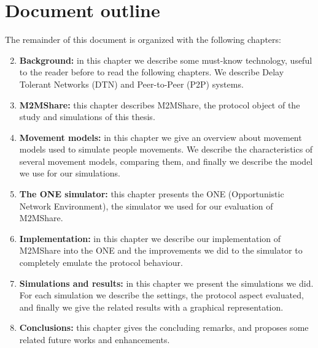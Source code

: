 \section{Document outline}
The remainder of this document is organized with the following chapters:
\begin{enumerate}
\setcounter{enumi}{1}
\item \textbf{Background:} in this chapter we describe some must-know technology, useful to the reader before to read the following chapters. We describe Delay Tolerant Networks (DTN) and Peer-to-Peer (P2P) systems.
\item \textbf{M2MShare:} this chapter describes M2MShare, the protocol object of the study and simulations of this thesis.
\item \textbf{Movement models:} in this chapter we give an overview about movement models used to simulate people movements. We describe the characteristics of several movement models, comparing them, and finally we describe the model we use for our simulations.
\item \textbf{The ONE simulator:} this chapter presents the ONE (Opportunistic Network Environment), the simulator we used for our evaluation of M2MShare.
\item \textbf{Implementation:} in this chapter we describe our implementation of M2MShare into the ONE and the improvements we did to the simulator to completely emulate the protocol behaviour.
\item \textbf{Simulations and results:} in this chapter we present the simulations we did. For each simulation we describe the settings, the protocol aspect evaluated, and finally we give the related results with a graphical representation.
\item \textbf{Conclusions:}  this chapter gives the concluding remarks, and proposes some related future works and enhancements. %

\end{enumerate}
 

